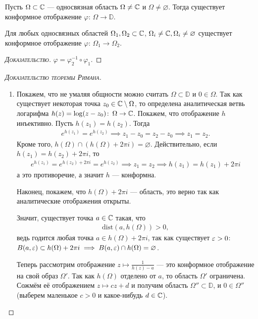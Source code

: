 \documentclass[../complex-analysis.tex]{subfiles}
\begin{document}
\begin{thm}
 Пусть $ \Omega \subset \mathbb{C} $ --- односвязная область  $ \Omega \neq \mathbb{C} $ и $ \Omega \neq \varnothing $. Тогда существует конформное отображение $ \varphi \colon\,\Omega\to\mathbb D $.
\end{thm}
\begin{crly}
 Для любых односвязных областей $ \Omega_1,\Omega_2 \subset \mathbb{C} $, $ \Omega_i \neq \mathbb{C}, \Omega_i \neq \varnothing $ существует конформное отображение $ \varphi \colon\, \Omega_1 \to \Omega_2 $.
\end{crly}
\begin{proof}[\normalfont\textsc{Доказательство}]
 $ \varphi = \varphi_2^{-1} \circ \varphi_1 $.
\end{proof}
\begin{proof}[\normalfont\textsc{Доказательство теоремы Римана}]\
 \begin{enumerate}
  \item Покажем, что не умаляя общности можно считать $ \Omega \subset \mathbb D $ и $ 0 \in \Omega$. Так как существует некоторая точка $ z_0 \in \mathbb{C} \setminus \Omega $, то определена аналитическая ветвь логарифма $ h(z) = \log (z - z_0) \colon\, \Omega \to \mathbb{C} $. Покажем, что отображение $ h $ инъективно. Пусть $ h(z_1) = h(z_2) $. Тогда
   \begin{align*}
    e^{h(z_1)} = e^{h(z_2)} \implies z_1 - z_0 = z_2 - z_0 \implies z_1 = z_2.
   \end{align*} Кроме того, $ h(\Omega) \cap (h(\Omega) + 2\pi i) = \varnothing $. Действительно, если $ h(z_1) = h(z_2) + 2\pi i $, то
   \begin{align*}
    e^{h(z_1)} = e^{h(z_2) + 2\pi i} = e^{h(z_2)} \implies z_1 = z_2 \implies h(z_1) = h(z_1) + 2 \pi i
   \end{align*} а это противоречие, а значит $h$ --- конформна.

   Наконец, покажем, что $ h(\Omega) + 2\pi i $ --- область, это верно так как аналитические отображения открыты.

   Значит, существует точка $ a \in \mathbb{C} $ такая, что
   \begin{align*}
    \mathrm{dist}(a, h(\Omega)) > 0,
   \end{align*} ведь годится любая точка $ a \in h(\Omega) + 2\pi i $, так как существует $ \varepsilon > 0 $: $ B(a,\varepsilon) \subset h(\Omega) + 2\pi i \implies B(a, \varepsilon) \cap h(\Omega) = \varnothing$.

   Теперь рассмотрим отображение $ z \mapsto \frac{1}{h(z) - a} $ --- это конформное отображение на свой образ $ \Omega' $. Так как $ h(\Omega) $ отделено от $ a $, то область $ \Omega' $ ограничена. Сожмём её отображением $ z \mapsto cz + d $ и получим область $ \Omega'' \subset \mathbb D $, и $ 0 \in \Omega'' $ (выберем маленькое $ c > 0 $ и какое-нибудь $ d \in \mathbb{C} $).


\end{enumerate}
\end{proof}
\end{document}
